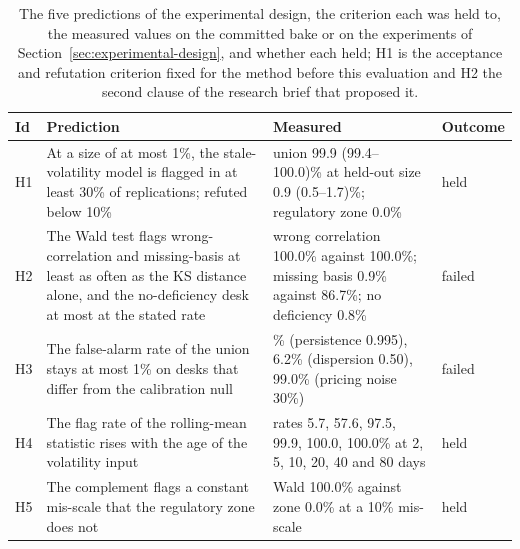 \begin{table}[htbp]
\centering
\footnotesize
\caption{The five predictions of the experimental design, the criterion each was held to, the measured values on the committed bake or on the experiments of Section~\ref{sec:experimental-design}, and whether each held; H1 is the acceptance and refutation criterion fixed for the method before this evaluation and H2 the second clause of the research brief that proposed it.}
\label{tab:hypotheses}
\begin{tabular}{l>{\raggedright\arraybackslash}p{4.8cm}>{\raggedright\arraybackslash}p{6.2cm}l}
\toprule
Id & Prediction & Measured & Outcome \\
\midrule
H1 & \relax At a size of at most 1\%, the stale-volatility model is flagged in at least 30\% of replications; refuted below 10\% & \relax union 99.9 (99.4--100.0)\% at held-out size 0.9 (0.5--1.7)\%; regulatory zone 0.0\% & held \\
H2 & The Wald test flags wrong-correlation and missing-basis at least as often as the KS distance alone, and the no-deficiency desk at most at the stated rate & \relax wrong correlation 100.0\% against 100.0\%; missing basis 0.9\% against 86.7\%; no deficiency 0.8\% & failed \\
H3 & \relax The false-alarm rate of the union stays at most 1\% on desks that differ from the calibration null & \relax 4.0\% (persistence 0.995), 6.2\% (dispersion 0.50), 99.0\% (pricing noise 30\%) & failed \\
H4 & The flag rate of the rolling-mean statistic rises with the age of the volatility input & \relax rates 5.7, 57.6, 97.5, 99.9, 100.0, 100.0\% at 2, 5, 10, 20, 40 and 80 days & held \\
H5 & The complement flags a constant mis-scale that the regulatory zone does not & \relax Wald 100.0\% against zone 0.0\% at a 10\% mis-scale & held \\
\bottomrule
\end{tabular}
\end{table}
